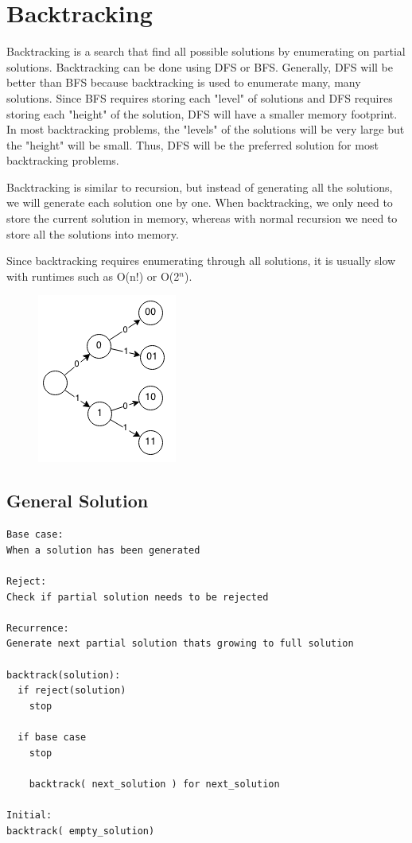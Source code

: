 \documentclass[11pt,oneside]{book}
\makeatletter
\def\maxwidth#1{\ifdim\Gin@nat@width>#1 #1\else\Gin@nat@width\fi}
\makeatother
\begin{document}
        \section{ Backtracking }
        

Backtracking is a search that find all possible solutions by enumerating on partial solutions. Backtracking can be done using DFS or BFS. Generally, DFS will be better than BFS because backtracking is used to enumerate many, many solutions. Since BFS requires storing each "level" of solutions and DFS requires storing each "height" of the solution, DFS will have a smaller memory footprint. In most backtracking problems, the "levels" of the solutions will be very large but the "height" will be small. Thus, DFS will be the preferred solution for most backtracking problems.

Backtracking is similar to recursion, but instead of generating all the solutions, we will generate each solution one by one. When backtracking, we only need to store the current solution in memory, whereas with normal recursion we need to store all the solutions into memory.

Since backtracking requires enumerating through all solutions, it is usually slow with runtimes such as O(n!) or O(2$^{n}$).

\vspace{5px}\begin{figure}[H]\centering
        \includegraphics[width=0.66\maxwidth{\textwidth}]{backtracking.png}
        \end{figure}

\subsection{General Solution}

\begin{lstlisting}
Base case:
When a solution has been generated

Reject:
Check if partial solution needs to be rejected

Recurrence:
Generate next partial solution thats growing to full solution

backtrack(solution):
  if reject(solution)
    stop

  if base case
    stop

    backtrack( next_solution ) for next_solution

Initial:
backtrack( empty_solution)
\end{lstlisting}
\end{document}
